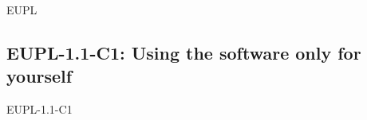 \begin{license}{EUPL}
\newcommand{\markAllProgramModifications}{
  \auxMarkAllModifications{program}}
\newcommand{\markAllLibraryModifications}{%
  \auxMarkAllModifications{library}}
\newcommand{\markAllEmbeddedModifications}{%
  \auxMarkAllModifications{embedded library}}

\newcommand{\auxApplyCopyleft}[1]{License your program, which includes the
  library, also under the EUPL-1.1.  Arrange the #1 of the on-top development in 
  a way that they are also covered by the EUPL-1.1 licensing statements.}

\newcommand{\applyCopyleftToSources}{\auxApplyCopyleft{sources}}
\newcommand{\applyCopyleftToBinaries}{\auxApplyCopyleft{binaries}}


\newcommand{\auxNewSources}{If you add new source
  code files, insert a header containing your copyright line and an EUPL-1.1
  adequate licensing the statement.}

\newcommand{\auxArrangeModifications}{Arrange your modifications in a way that
  they are covered by the existing EUPL-1.1 licensing statements.}

\newcommand{\arrangeBinaryModifications}{\auxArrangeModifications}
\newcommand{\arrangeSourceModifications}{\auxArrangeModifications\ \auxNewSources}


\newcommand{\addModificationTextFile}{Create a \emph{modification text file}, 
  if such a file still does not exist. \emph{Add} a description of your
  modifications to the \emph{modification text file.}}


\newcommand{\copyrightDialog}{Let the copyright dialog of the on-top development
  clearly say, that it uses the EUPL-1.1 licensed library and that it is itself
  licensed under the EUPL-1.1, too.}

\subsection{EUPL-1.1-C1: Using the software only for yourself}
\begin{lsuc}{EUPL-1.1-C1}


\end{lsuc}
\end{license}
